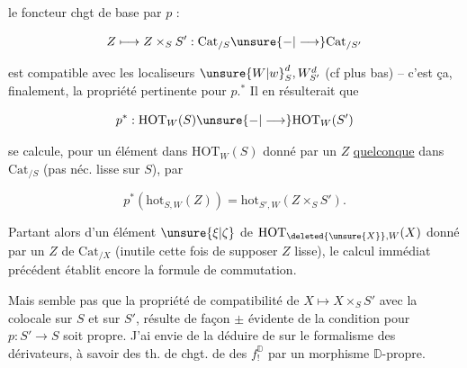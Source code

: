 
le foncteur chgt de base par $p$ : 

\[
 Z\longmapsto Z\times_S S':\mathrm{Cat}_{/S}\unsure{\mathord{-}|\longrightarrow}\mathrm{Cat}_{/S'}
\]

est compatible avec les localiseurs $\unsure{W|w}_S^d,W_{S'}^d$ (cf plus bas) -- c'est ça, finalement, la propriété pertinente pour $p$.$^*$ Il en résulterait que


\[
 p^*:\mathrm{HOT}_W(S)\unsure{\mathord{-}|\longrightarrow}\mathrm{HOT}_W(S')
\]

se calcule, pour un élément dans $\mathrm{HOT}_W(S)$ donné par un $Z$ \uline{quelconque} dans $\mathrm{Cat}_{/S}$ (pas néc. lisse sur $S$), par

\[
 p^*(\mathrm{hot}_{S,W}(Z))=\mathrm{hot}_{S',W}(Z\times_S S').
\]

Partant alors  d'un élément $\unsure{\xi|\zeta}$ de $\mathrm{HOT}_{\deleted{\unsure{X}},W}(X)$ donné par un $Z$ de $\mathrm{Cat}_{/X}$ (inutile cette fois de supposer $Z$ lisse), le calcul immédiat précédent établit encore la formule de commutation.

Mais   semble pas que la propriété de compatibilité de $X\longmapsto X\times_S S'$ avec la  colocale sur $S$ et sur $S'$, résulte de façon $\pm$ évidente de la condition pour $p:S'\longrightarrow S$ soit propre. J'ai envie de la déduire de  sur le formalisme des dérivateurs, à savoir des th. de chgt. de  des $f_!^{\mathbb D}$ par un morphisme $\mathbb D$-propre.



